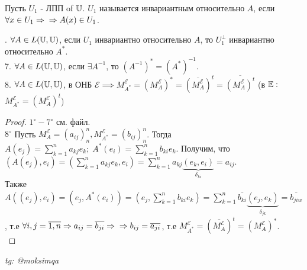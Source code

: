 \documentclass[../main.tex]{subfiles}
\begin{document}
\begin{definition}
Пусть $U_{1}$ - ЛПП of $\U $. $U_{1}$ называется инвариантным относительно $A$, если $\forall x \in U_{1} \implies\\\implies A(x) \in U_{1}$.    
\end{definition}
. $\forall A \in L(\U,\U)$, если $U_{1}$ инвариантно относительно $A$, то $U_{1}^{\perp}$ инвариантно относительно $A^{*}$. \\ 
7. $\forall A \in L(\U,\U)$, если $\exists A^{-1}$, то $(A^{-1})^{*}= (A^{*})^{-1}$. \\
8. $\forall A \in L(\U,\U)$, в ОНБ $\mathcal{E} \implies M_{A^{*}}^{\mathcal{E}} = \left(M_{A}^{\mathcal{E}}\right)^{*} = \left(\overline{M_{A}^{\mathcal{E}}}\right)^{t} = \overline{\left(M_{A}^{\mathcal{E}}\right)^{t}}$ \; (в $\E:$ $M_{A^{*}}^{\mathcal{E}} = \left(M_{A}^{\mathcal{E}}\right)^{t}$) 
\begin{proof}
    $1^{\circ} - 7^{\circ}$ см. файл. 
    \\$8^{\circ}$\; Пусть $M_{A}^{\mathcal{E}} = (a_{ij})^{n}_{n}, M_{A^{*}}^{\mathcal{E}} = (b_{ij})^{n}_{n}$. Тогда $A(e_{j}) = \sum_{k=1}^{n } a_{kj}e_{k}; \; A^{*}(e_{i})= \sum_{ k=1}^{n   } b_{ki}e_{k}$. Получим, что $(A(e_{j}),e_{i}) = \left(\sum_{k=1}^{n    } a_{kj}e_{k},e_{i}\right) = \sum_{k=1}^{n } a_{kj}\underbrace{(e_{k},e_{i})}_{\delta_{ki}} = a_{ij}$.\\ Также $A((e_{j}),e_{i}) = (e_{j},A^{*}(e_{i})) = \left(e_{j},\sum_{k=1}^{n } b_{ki}e_{k}\right) = \sum_{k=1}^{n } \overline{b_{ki}} \underbrace{(e_{j},e_{k})}_{\delta_{jk} } = \overline{b_{jiw}}$, т.е $\forall i,j=\overline{1,n} \implies a_{ij} = \overline{b_{ji}} \implies\\\implies b_{ij} = \overline{a_{ji}}$, т.е $M_{A^{*}}^{\mathcal{E}} = \left(\overline{M_{A}^{\mathcal{E}}}\right)^{t} = \left(M_{A}^{\mathcal{E}}\right)^{*}$.\\
\end{proof}







\vspace{1cm}
\begin{flushright}
    \textit{tg: @moksimqa}
\end{flushright}
\end{document}
